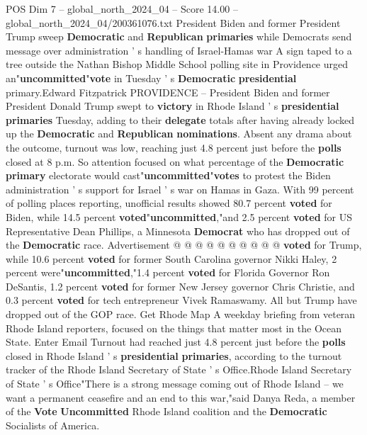 \begin{textsample}{POS Dim 7 – global\_north\_2024\_04 – Score 14.00 – global\_north\_2024\_04/200361076.txt}  \label{ex:f7_pos_062}
President Biden and former President Trump sweep \textbf{Democratic} and \textbf{Republican} \textbf{primaries} while Democrats send message over administration ' s handling of Israel-Hamas war A sign taped to a tree outside the Nathan Bishop Middle School polling site in Providence urged an"\textbf{uncommitted}"\textbf{vote} in Tuesday ' s \textbf{Democratic} \textbf{presidential} primary.Edward Fitzpatrick PROVIDENCE -- President Biden and former President Donald Trump swept to \textbf{victory} in Rhode Island ' s \textbf{presidential} \textbf{primaries} Tuesday, adding to their \textbf{delegate} totals after having already locked up the \textbf{Democratic} and \textbf{Republican} \textbf{nominations}.
Absent any drama about the outcome, turnout was low, reaching just 4.8 percent just before the \textbf{polls} closed at 8 p.m.
So attention focused on what percentage of the \textbf{Democratic} \textbf{primary} electorate would cast"\textbf{uncommitted}"\textbf{votes} to protest the Biden administration ' s support for Israel ' s war on Hamas in Gaza.
With 99 percent of polling places reporting, unofficial results showed 80.7 percent \textbf{voted} for Biden, while 14.5 percent \textbf{voted}"\textbf{uncommitted},"and 2.5 percent \textbf{voted} for US Representative Dean Phillips, a Minnesota \textbf{Democrat} who has dropped out of the \textbf{Democratic} race.
Advertisement @ @ @ @ @ @ @ @ @ @ \textbf{voted} for Trump, while 10.6 percent \textbf{voted} for former South Carolina governor Nikki Haley, 2 percent were"\textbf{uncommitted},"1.4 percent \textbf{voted} for Florida Governor Ron DeSantis, 1.2 percent \textbf{voted} for former New Jersey governor Chris Christie, and 0.3 percent \textbf{voted} for tech entrepreneur Vivek Ramaswamy.
All but Trump have dropped out of the GOP race.
Get Rhode Map A weekday briefing from veteran Rhode Island reporters, focused on the things that matter most in the Ocean State.
Enter Email Turnout had reached just 4.8 percent just before the \textbf{polls} closed in Rhode Island ' s \textbf{presidential} \textbf{primaries}, according to the turnout tracker of the Rhode Island Secretary of State ' s Office.Rhode Island Secretary of State ' s Office"There is a strong message coming out of Rhode Island -- we want a permanent ceasefire and an end to this war,"said Danya Reda, a member of the \textbf{Vote} \textbf{Uncommitted} Rhode Island coalition and the \textbf{Democratic} Socialists of America.

\end{textsample}
